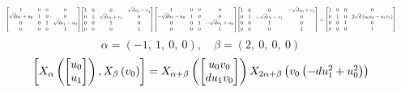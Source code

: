 \documentclass[11pt]{article}
\theoremstyle{definition}
\begin{document}
\[
\scaletoalign{\textwidth}{{\left[\begin{matrix}1 & 0 & 0 & 0\\\sqrt{d} u_{1} + u_{0} & 1 & 0 & 0\\0 & 0 & 1 & \sqrt{d} u_{1} - u_{0}\\0 & 0 & 0 & 1\end{matrix}\right]} {\left[\begin{matrix}1 & 0 & 0 & \sqrt{d} v_{0} - v_{1}\\0 & 1 & \sqrt{d} v_{0} + v_{1} & 0\\0 & 0 & 1 & 0\\0 & 0 & 0 & 1\end{matrix}\right]} {\left[\begin{matrix}1 & 0 & 0 & 0\\- \sqrt{d} u_{1} - u_{0} & 1 & 0 & 0\\0 & 0 & 1 & - \sqrt{d} u_{1} + u_{0}\\0 & 0 & 0 & 1\end{matrix}\right]} {\left[\begin{matrix}1 & 0 & 0 & - \sqrt{d} v_{0} + v_{1}\\0 & 1 & - \sqrt{d} v_{0} - v_{1} & 0\\0 & 0 & 1 & 0\\0 & 0 & 0 & 1\end{matrix}\right]} = {\left[\begin{matrix}1 & 0 & 0 & 0\\0 & 1 & 0 & 2 \sqrt{d} \left(u_{0} v_{0} - u_{1} v_{1}\right)\\0 & 0 & 1 & 0\\0 & 0 & 0 & 1\end{matrix}\right]}}
\]
\[
\alpha = \left( -1, \  1, \  0, \  0\right), \quad \beta = \left( 2, \  0, \  0, \  0\right)
\]
\[
\scaletoalign{\textwidth}{\left[ X_{\alpha}\left(\left[\begin{matrix}u_{0}\\u_{1}\end{matrix}\right]\right), X_{\beta}\left(v_{0}\right) \right] = X_{\alpha + \beta}\left(\left[\begin{matrix}u_{0} v_{0}\\d u_{1} v_{0}\end{matrix}\right]\right) X_{2\alpha + \beta}\left(v_{0} \left(- d u_{1}^{2} + u_{0}^{2}\right)\right)}
\]
\end{document}
